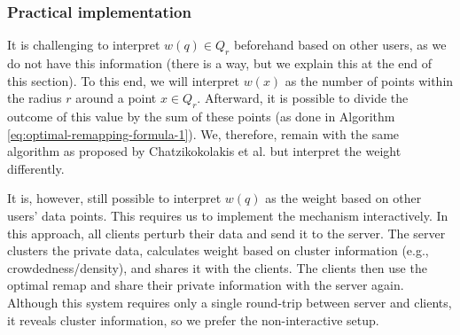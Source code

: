 \subsubsection{Practical implementation}
It is challenging to interpret $w(q) \in Q_r$ beforehand based on other users, as we do not have this information (there is a way, but we explain this at the end of this section).
To this end, we will interpret $w(x)$ as the number of points within the radius $r$ around a point $x \in Q_r$.
Afterward, it is possible to divide the outcome of this value by the sum of these points (as done in Algorithm \ref{eq:optimal-remapping-formula-1}).
We, therefore, remain with the same algorithm as proposed by Chatzikokolakis et al. but interpret the weight differently.

It is, however, still possible to interpret $w(q)$ as the weight based on other users' data points.
This requires us to implement the mechanism interactively.
In this approach, all clients perturb their data and send it to the server.
The server clusters the private data, calculates weight based on cluster information (e.g., crowdedness/density), and shares it with the clients.
The clients then use the optimal remap and share their private information with the server again.
Although this system requires only a single round-trip between server and clients, it reveals cluster information, so we prefer the non-interactive setup.

